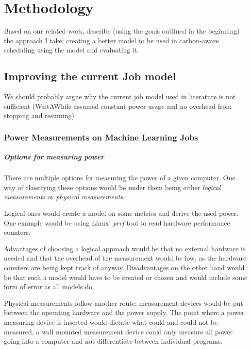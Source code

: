 \chapter{Methodology}

Based on our related work, describe (using the goals outlined in the beginning) the approach I take:
creating a better model to be used in carbon-aware scheduling 
using the model and evaluating it.
\section{Improving the current Job model} \label{sec:improving_the_model}

We should probably argue why the current job model used in literature is not sufficient (WaitAWhile\cite{wiesner_lets_2021} assumed constant power usage and no overhead from stopping and resuming)

\subsection{Power Measurements on Machine Learning Jobs}
\label{sec:power_measurements}


\paragraph{Options for measuring power}

There are multiple options for measuring the power of a given computer. One way of classifying these options would be under them being either \emph{logical measurements} or \emph{physical measurements}.

Logical ones would create a model on some metrics and derive the used power. One example would be using Linux' \emph{perf} tool to read hardware performance counters. 

Advantages of choosing a logical approach would be that no external hardware is needed and that the overhead of the measurement would be low, as the hardware counters are being kept track of anyway. Disadvantages on the other hand would be that such a model would have to be created or chosen and would include some form of error as all models do.

Physical measurements follow another route; measurement devices would be put between the operating hardware and the power supply. The point where a power measuring device is inserted would dictate what could and could not be measured, a wall mounted measurement device could only measure all power going into a computer and not differentiate between individual programs.

